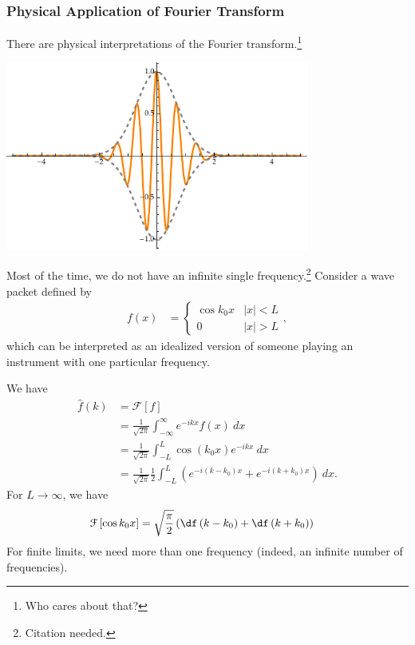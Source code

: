 \documentclass[10pt]{mypackage}
\begin{document}
\subsubsection{Physical Application of Fourier Transform}%
There are physical interpretations of the Fourier transform.\footnote{Who cares about that?}
\begin{example}
  \begin{center}
    \includegraphics[width=10cm]{images/fourier_transform_example.pdf}
  \end{center}
  Most of the time, we do not have an infinite single frequency.\footnote{Citation needed.} Consider a wave packet defined by
  \begin{align*}
    f(x) &= \begin{cases}
      \cos k_0 x & |x| < L\\
      0 & |x| > L
    \end{cases},
  \end{align*}
  which can be interpreted as an idealized version of someone playing an instrument with one particular frequency.\newline

  We have
  \begin{align*}
    \widehat{f}(k) &= \mathcal{F}\left[f\right]\\
                   &= \frac{1}{\sqrt{2\pi}}\int_{-\infty}^{\infty} e^{-ikx}f(x)\:dx\\
                   &= \frac{1}{\sqrt{2\pi}}\int_{-L}^{L} \cos\left(k_0x\right)e^{-ikx}\:dx\\
                   &= \frac{1}{\sqrt{2\pi}}\frac{1}{2}\int_{-L}^{L} \left(e^{-i\left(k-k_0\right)x} + e^{-i\left(k + k_0\right)x}\right)\:dx.
  \end{align*}
  For $L\rightarrow\infty$, we have
  \begin{align*}
    \mathcal{F}\left[\cos k_0 x\right] &= \sqrt{\frac{\pi}{2}}\left(\df\left(k-k_0\right) + \df\left(k + k_0\right)\right)
  \end{align*}
  For finite limits, we need more than one frequency (indeed, an infinite number of frequencies).\newline


\end{example}
\end{document}
